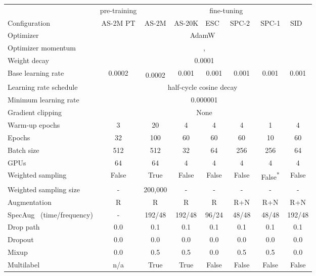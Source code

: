 \documentclass{article}
\newcommand{\tablestyle}[2]{\setlength{\tabcolsep}{#1}\renewcommand{\arraystretch}{#2}\centering\footnotesize}
\begin{document}
\begin{table*}[t]\centering \tablestyle{2pt}{1.1}
    \setlength\tabcolsep{3.0pt}
    \begin{tabular}{l|c|cccccc}
        & pre-training & \multicolumn{6}{c}{fine-tuning} \\
        Configuration & AS-2M PT  & AS-2M  & AS-20K  & ESC~\cite{piczak2015dataset}  & SPC-2~\cite{speechcommandsv2}  & SPC-1 & SID~\cite{Nagrani2020VoxcelebLS} \\
        \toprule
        Optimizer & \multicolumn{7}{c}{AdamW~\cite{adamw}}\\
        Optimizer momentum & \multicolumn{7}{c}{, }\\
        Weight decay & \multicolumn{7}{c}{0.0001} \\
        Base learning rate & 0.0002 & 0.0002\textsuperscript{} & 0.001& 0.001 & 0.001 & 0.001 & 0.001\\
        Learning rate schedule & \multicolumn{7}{c}{half-cycle cosine decay~\cite{sgdr}}\\
        Minimum learning rate & \multicolumn{7}{c}{0.000001}\\
        Gradient clipping & \multicolumn{7}{c}{None}\\
        Warm-up epochs & 3 & 20 & 4  & 4 &  4 & 1 & 4\\
        Epochs & 32 & 100 & 60 & 60 & 60 & 10 & 60 \\
        Batch size & 512 & 512 & 32 & 64 & 256 & 256 & 64\\
        GPUs & 64 & 64 & 4 & 4 & 4 & 4 & 4\\
        Weighted sampling  & False & True & False & False & False & False\textsuperscript{*} & False\\
        Weighted sampling  size & - & 200,000 & - & -& - & - & -\\
Augmentation & R & R & R & R & R+N & R+N & R+N \\
        SpecAug~\cite{Park2019SpecAugmentAS} (time/frequency) & - & 192/48 & 192/48 &  96/24 & 48/48 & 48/48 & 192/48 \\
        Drop path~\cite{droppath} & 0.0 & 0.1 & 0.1 & 0.1 & 0.1 & 0.1 & 0.1 \\
        Dropout~\cite{dropout} & 0.0 & 0.0 & 0.0 & 0.0 & 0.0 & 0.0 & 0.0 \\
        Mixup~\cite{mixup} & 0.0 & 0.5 & 0.5 & 0.0 & 0.5 & 0.5 & 0.0 \\
        Multilabel &n/a & True& True& False & False & False & False\\

\end{tabular}
\end{table*}
\end{document}
